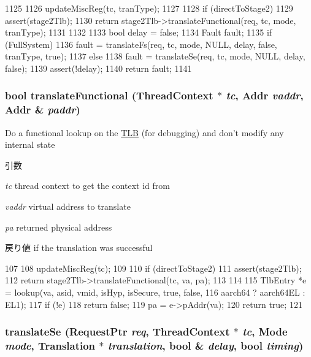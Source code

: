 \begin{DoxyCode}
1125 {
1126     updateMiscReg(tc, tranType);
1127 
1128     if (directToStage2) {
1129         assert(stage2Tlb);
1130         return stage2Tlb->translateFunctional(req, tc, mode, tranType);
1131     }
1132 
1133     bool delay = false;
1134     Fault fault;
1135     if (FullSystem)
1136         fault = translateFs(req, tc, mode, NULL, delay, false, tranType, true);
1137    else
1138         fault = translateSe(req, tc, mode, NULL, delay, false);
1139     assert(!delay);
1140     return fault;
1141 }
\end{DoxyCode}
\hypertarget{classArmISA_1_1TLB_a4871909ce80dc11f7ddffcd28214262e}{
\subsubsection[{translateFunctional}]{\setlength{\rightskip}{0pt plus 5cm}bool translateFunctional ({\bf ThreadContext} $\ast$ {\em tc}, \/  {\bf Addr} {\em vaddr}, \/  {\bf Addr} \& {\em paddr})}}
\label{classArmISA_1_1TLB_a4871909ce80dc11f7ddffcd28214262e}
Do a functional lookup on the \hyperlink{classArmISA_1_1TLB}{TLB} (for debugging) and don't modify any internal state 
\begin{DoxyParams}{引数}
\item[{\em tc}]thread context to get the context id from \item[{\em vaddr}]virtual address to translate \item[{\em pa}]returned physical address \end{DoxyParams}
\begin{DoxyReturn}{戻り値}
if the translation was successful 
\end{DoxyReturn}



\begin{DoxyCode}
107 {
108     updateMiscReg(tc);
109 
110     if (directToStage2) {
111         assert(stage2Tlb);
112         return stage2Tlb->translateFunctional(tc, va, pa);
113     }
114 
115     TlbEntry *e = lookup(va, asid, vmid, isHyp, isSecure, true, false,
116                          aarch64 ? aarch64EL : EL1);
117     if (!e)
118         return false;
119     pa = e->pAddr(va);
120     return true;
121 }
\end{DoxyCode}
\hypertarget{classArmISA_1_1TLB_a6ada13dabe05b90fee0464345cf0f654}{
\subsubsection[{translateSe}]{ translateSe ({\bf RequestPtr} {\em req}, \/  {\bf ThreadContext} $\ast$ {\em tc}, \/  {\bf Mode} {\em mode}, \/  {\bf Translation} $\ast$ {\em translation}, \/  bool \& {\em delay}, \/  bool {\em timing})}}
\label{classArmISA_1_1TLB_a6ada13dabe05b90fee0464345cf0f654}




